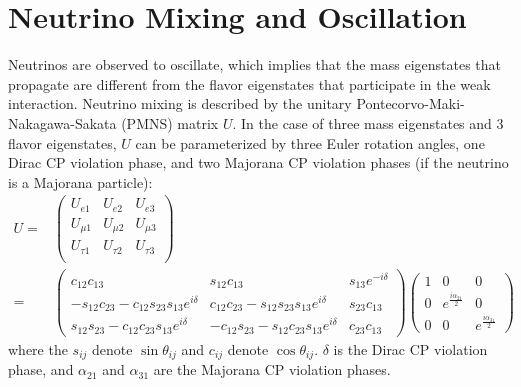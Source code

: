 \documentclass[herrin-thesis.tex]{subfiles}
\begin{document}
\section{Neutrino Mixing and Oscillation}
Neutrinos are observed to oscillate, which implies that the mass eigenstates that propagate are different from the flavor eigenstates that participate in the weak interaction. Neutrino mixing is described by the unitary Pontecorvo-Maki-Nakagawa-Sakata (PMNS) matrix \(U\). In the case of three mass eigenstates and 3 flavor eigenstates, \(U\) can be parameterized by three Euler rotation angles, one Dirac CP violation phase, and two Majorana CP violation phases (if the neutrino is a Majorana particle):
\begin{align}
U =&\begin{pmatrix}
	U_{e1}	&	U_{e2}	& 	U_{e3}	\\
	U_{\mu1}	&	U_{\mu2}	& 	U_{\mu3}	\\
	U_{\tau1}	&	U_{\tau2}	& 	U_{\tau3}	\\
	\end{pmatrix}\\
	=&\begin{pmatrix}
	c_{12}c_{13}							&	s_{12}c_{13}							&	s_{13}e^{-i\delta}	\\
	-s_{12}c_{23}-c_{12}s_{23}s_{13}e^{i\delta}	&	c_{12}c_{23}-s_{12}s_{23}s_{13}e^{i\delta}	&	s_{23}c_{13}		\\
	s_{12}s_{23}-c_{12}c_{23}s_{13}e^{i\delta}	&	-c_{12}s_{23}-s_{12}c_{23}s_{13}e^{i\delta}	&	c_{23}c_{13}
	\end{pmatrix}
	\begin{pmatrix}
	1	&	0					&	0	\\
	0	&	e^{\frac{i\alpha_{21}}{2}}	&	0	\\
	0	&	0					&	e^{\frac{i\alpha_{31}}{2}}
	\end{pmatrix}\nonumber
\label{eq:nu_pmns_matrix}
\end{align}
where the \(s_{ij}\) denote \(\sin\theta_{ij}\) and \(c_{ij}\) denote \(\cos\theta_{ij}\). \(\delta\) is the Dirac CP violation phase, and \(\alpha_{21}\) and \(\alpha_{31}\) are the Majorana CP violation phases.
\end{document}
